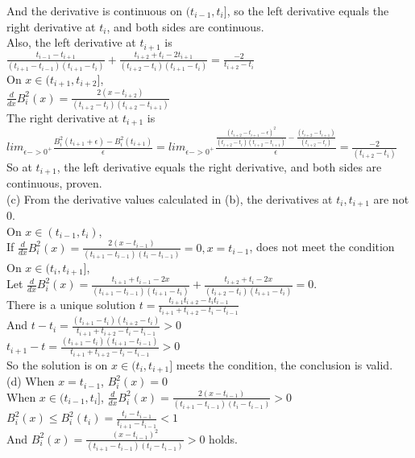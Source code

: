 \documentclass[a4paper]{article}
\begin{document}
And the derivative is continuous on $(t_{i-1},t_i]$, so the left derivative equals the right derivative at $t_i$, and both sides are continuous.\\
Also, the left derivative at $t_{i+1}$ is $\frac{t_{i-1}-t_{i+1}}{(t_{i+1} - t_{i-1})(t_{i+1}-t_i)}  + \frac{t_{i+2}+t_i-2t_{i+1}}{(t_{i+2} - t_i)(t_{i+1}-t_i)}=\frac{-2}{t_{i+2}-t_i}$\\
On $x \in (t_{i+1},t_{i+2}]$,\\
$\frac{d}{dx}B^2_i(x)=\frac{2(x-t_{i+2})}{(t_{i+2}-t_{i})(t_{i+2}-t_{i+1})}$\\
The right derivative at $t_{i+1}$ is $lim_{\epsilon->0^{+}}\frac{B^2_i(t_{i+1}+\epsilon)-B^2_i(t_{i+1})}{\epsilon}=lim_{\epsilon->0^{+}}\frac{\frac{(t_{i+2}-t_{i+1}-\epsilon)^2}{(t_{i+2} - t_i)(t_{i+2}-t_{i+1})}-\frac{(t_{i+2}-t_{i+1})}{(t_{i+2} - t_i)}}{\epsilon}=\frac{-2}{(t_{i+2}-t_{i})}$\\
So at $t_{i+1}$, the left derivative equals the right derivative, and both sides are continuous, proven.\\
(c)
From the derivative values calculated in (b), the derivatives at $t_i,t_{i+1}$ are not 0.\\
On $x \in (t_{i-1},t_i)$,\\
If $\frac{d}{dx}B^2_i(x)=\frac{2(x-t_{i-1})}{(t_{i+1}-t_{i-1})(t_i-t_{i-1})}=0,x=t_{i-1}$, does not meet the condition\\
On $x \in (t_{i},t_{i+1}]$,\\
Let $\frac{d}{dx}B^2_i(x)= \frac{t_{i+1}+t_{i-1}-2x}{(t_{i+1} - t_{i-1})(t_{i+1}-t_i)}  + \frac{t_{i+2}+t_i-2x}{(t_{i+2} - t_i)(t_{i+1}-t_i)} =0.$\\
There is a unique solution $t=\frac{t_{i+1}t_{i+2}-t_{i}t_{i-1}}{t_{i+1}+t_{i+2}-t_{i}-t_{i-1}}$\\
And $t-t_i=\frac{(t_{i+1}-t_i)(t_{i+2}-t_i)}{t_{i+1}+t_{i+2}-t_{i}-t_{i-1}}>0$\\
$t_{i+1}-t=\frac{(t_{i+1}-t_i)(t_{i+1}-t_{i-1})}{t_{i+1}+t_{i+2}-t_{i}-t_{i-1}}>0$\\
So the solution is on $x \in (t_{i},t_{i+1}]$ meets the condition, the conclusion is valid.\\
(d)
When \( x = t_{i-1} \), \( B_i^2(x) = 0 \) \\
When \( x \in (t_{i-1}, t_i] \), \( \frac{d}{dx}B^2_i(x) = \frac{2(x-t_{i-1})}{(t_{i+1}-t_{i-1})(t_i-t_{i-1})} > 0 \) \\
\( B_i^2(x) \leq B_i^2(t_i) = \frac{t_i-t_{i-1}}{t_{i+1}-t_{i-1}} < 1 \) \\
And \( B_i^2(x) = \frac{(x-t_{i-1})^2}{(t_{i+1}-t_{i-1})(t_i-t_{i-1})} > 0 \) holds. \\
\end{document}
